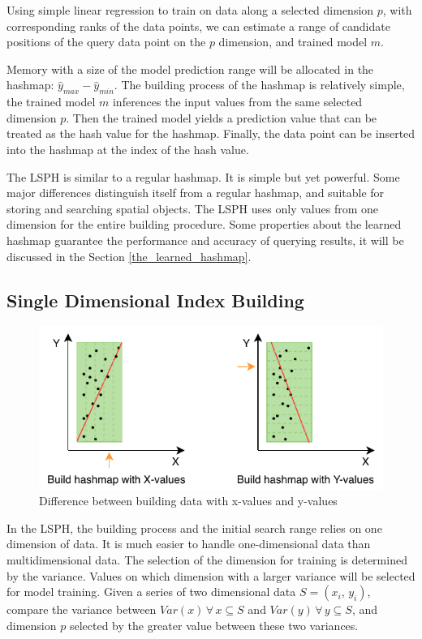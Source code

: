Using simple linear regression to train on data along a selected dimension $p$, with corresponding ranks of the data points, we can estimate a range of candidate positions of the query data point on the $p$ dimension, and trained model $m$. 

Memory with a size of the model prediction range will be allocated in the hashmap: $\hat{y}_{max} - \hat{y}_{min}$. The building process of the hashmap is relatively simple, the trained model $m$ inferences the input values from the same selected dimension $p$. Then the trained model yields a prediction value that can be treated as the hash value for the hashmap. Finally, the data point can be inserted into the hashmap at the index of the hash value. 

The LSPH is similar to a regular hashmap. It is simple but yet powerful. Some major differences distinguish itself from a regular hashmap, and suitable for storing and searching spatial objects. The LSPH uses only values from one dimension for the entire building procedure. Some properties about the learned hashmap guarantee the performance and accuracy of querying results, it will be discussed in the Section \ref{the_learned_hashmap}. 


\subsection{Single Dimensional Index Building}


\begin{figure}[ht]
\centering
\includegraphics{Figures/single_dimension.pdf}
\caption{Difference between building data with x-values and y-values}
\label{fig:single_dimension}
\end{figure}

In the LSPH, the building process and the initial search range relies on one dimension of data. It is much easier to handle one-dimensional data than multidimensional data. The selection of the dimension for training is determined by the variance. Values on which dimension with a larger variance will be selected for model training. Given a series of two dimensional data $S = (x_i,\, y_i)$, compare the variance between $Var(x) \, \forall \, x \subseteq S$ and $Var(y) \, \forall \, y \subseteq S$, and dimension $p$ selected by the greater value between these two variances.


